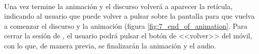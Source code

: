 \documentclass{subfiles}
\begin{document}
        \paragraph{}
        Una vez termine la animación y el discurso volverá a aparecer la retícula, indicando al usuario que puede volver a pulsar sobre la pantalla para que vuelva a comenzar el discurso y la animación (figura \ref{fig:7_end_of_animation}. Para cerrar la sesión de \ra, el usuario podrá pulsar el botón de <<volver>> del móvil, con lo que, de manera previa, se finalizarán la animación y el audio.
\end{document}
